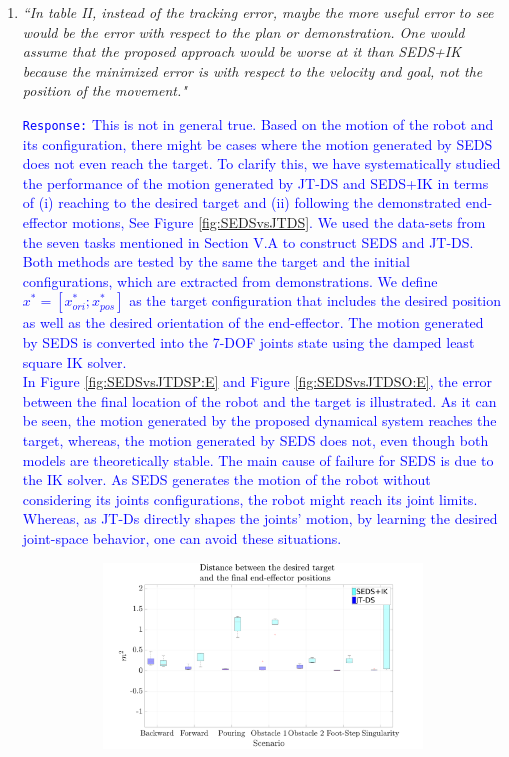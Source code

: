 \documentclass[10pt,stdletter,dateno]{newlfm}
\begin{document}
\begin{newlfm}
\begin{enumerate}
\item \textit{``In table II, instead of the tracking error, maybe the more useful
error to see would be the error with respect to the plan or
demonstration. One would assume that the proposed approach would be
worse at it than SEDS+IK because the minimized error is with respect to
the velocity and goal, not the position of the movement."}\\
\textcolor{blue}{\texttt{Response:} \small This is not in general true. Based on the motion of the robot and its configuration, there might be cases where the motion generated by SEDS does not even reach the target. To clarify this, we have systematically studied the performance of the motion generated by JT-DS and SEDS+IK in terms of (i) reaching to the desired target and (ii) following the demonstrated end-effector motions, See Figure \ref{fig:SEDSvsJTDS}. We used the data-sets from the seven tasks mentioned in Section V.A to construct SEDS and JT-DS. Both methods are tested by the same the target and the initial configurations, which are extracted from demonstrations. We define $ x^*=[x^*_{ori};x^*_{pos}] $ as the target configuration that includes the desired position as well as the desired  orientation of the end-effector. The motion generated by SEDS is converted into the 7-DOF joints state using the damped least square IK solver.\\ 
In Figure \ref{fig:SEDSvsJTDSP:E} and Figure \ref{fig:SEDSvsJTDSO:E}, the error between the final location of the robot and the target is illustrated. As it can be seen, the motion generated by the proposed dynamical system reaches the target, whereas, the motion generated by SEDS does not, even though both models are theoretically stable. The main cause of failure for SEDS is due to the IK solver. As SEDS generates the motion of the robot without considering its joints configurations, the robot might reach its joint limits.  Whereas, as JT-Ds directly shapes the joints' motion, by learning the desired joint-space behavior, one can avoid these situations.   \\ 
\begin{figure}[t]
 \hspace*{-2.4cm}
	\begin{subfigure}[t]{0.63\textwidth}
	\centering
		\includegraphics[trim={2cm 0.0cm 3.25cm 0cm},clip,width=\textwidth]{Pics/SEDS_JT_P_End.pdf}

\end{subfigure}
\end{figure}}
\end{enumerate}
\end{newlfm}
\end{document}
